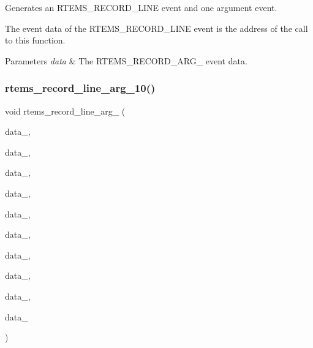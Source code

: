 Generates an R\+T\+E\+M\+S\+\_\+\+R\+E\+C\+O\+R\+D\+\_\+\+L\+I\+NE event and one argument event. 

The event data of the R\+T\+E\+M\+S\+\_\+\+R\+E\+C\+O\+R\+D\+\_\+\+L\+I\+NE event is the address of the call to this function.


\begin{DoxyParams}{Parameters}
{\em data} & The R\+T\+E\+M\+S\+\_\+\+R\+E\+C\+O\+R\+D\+\_\+\+A\+R\+G\+\_ event data. \\
\hline
\end{DoxyParams}
\mbox{\label{group__RTEMSRecord_ga29c660908f2516727be5446bf0bd5bf7}} 
\subsubsection{\texorpdfstring{rtems\_record\_line\_arg\_10()}{rtems\_record\_line\_arg\_10()}}
{\footnotesize\ttfamily void rtems\+\_\+record\+\_\+line\+\_\+arg\+\_ (\begin{DoxyParamCaption}\item[{\mbox{\hyperlink{group__RTEMSRecord_gab483bd3ec735835dac6788b78c817eab}{rtems\+\_\+record\+\_\+data}}}]{data\+\_,  }\item[{\mbox{\hyperlink{group__RTEMSRecord_gab483bd3ec735835dac6788b78c817eab}{rtems\+\_\+record\+\_\+data}}}]{data\+\_,  }\item[{\mbox{\hyperlink{group__RTEMSRecord_gab483bd3ec735835dac6788b78c817eab}{rtems\+\_\+record\+\_\+data}}}]{data\+\_,  }\item[{\mbox{\hyperlink{group__RTEMSRecord_gab483bd3ec735835dac6788b78c817eab}{rtems\+\_\+record\+\_\+data}}}]{data\+\_,  }\item[{\mbox{\hyperlink{group__RTEMSRecord_gab483bd3ec735835dac6788b78c817eab}{rtems\+\_\+record\+\_\+data}}}]{data\+\_,  }\item[{\mbox{\hyperlink{group__RTEMSRecord_gab483bd3ec735835dac6788b78c817eab}{rtems\+\_\+record\+\_\+data}}}]{data\+\_,  }\item[{\mbox{\hyperlink{group__RTEMSRecord_gab483bd3ec735835dac6788b78c817eab}{rtems\+\_\+record\+\_\+data}}}]{data\+\_,  }\item[{\mbox{\hyperlink{group__RTEMSRecord_gab483bd3ec735835dac6788b78c817eab}{rtems\+\_\+record\+\_\+data}}}]{data\+\_,  }\item[{\mbox{\hyperlink{group__RTEMSRecord_gab483bd3ec735835dac6788b78c817eab}{rtems\+\_\+record\+\_\+data}}}]{data\+\_,  }\item[{\mbox{\hyperlink{group__RTEMSRecord_gab483bd3ec735835dac6788b78c817eab}{rtems\+\_\+record\+\_\+data}}}]{data\+\_ }\end{DoxyParamCaption})}



